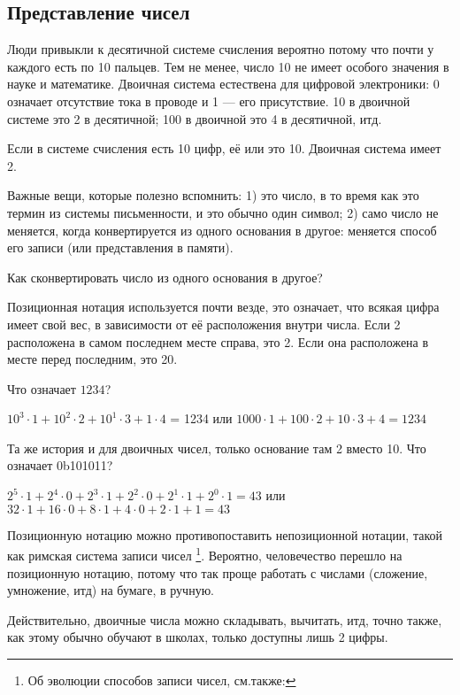 \subsection{Представление чисел}

Люди привыкли к десятичной системе счисления вероятно потому что почти у каждого есть по 10 пальцев.
Тем не менее, число 10 не имеет особого значения в науке и математике.
Двоичная система естествена для цифровой электроники: 0 означает отсутствие тока в проводе и 1 --- его присутствие.
10 в двоичной системе это 2 в десятичной; 100 в двоичной это 4 в десятичной, итд.

Если в системе счисления есть 10 цифр, её  или  это 10.
Двоичная система имеет  2.

Важные вещи, которые полезно вспомнить:
1)  это число, в то время как  это термин из системы письменности, и это обычно один символ;
2) само число не меняется, когда конвертируется из одного основания в другое: меняется способ его записи (или представления
в памяти).

Как сконвертировать число из одного основания в другое?

Позиционная нотация используется почти везде, это означает, что всякая цифра имеет свой вес, в зависимости от её расположения
внутри числа.
Если 2 расположена в самом последнем месте справа, это 2.
Если она расположена в месте перед последним, это 20.

Что означает $1234$?

$10^3 \cdot 1 + 10^2 \cdot 2 + 10^1 \cdot 3 + 1 \cdot 4$ = 1234 или
$1000 \cdot 1 + 100 \cdot 2 + 10 \cdot 3 + 4 = 1234$

Та же история и для двоичных чисел, только основание там 2 вместо 10.
Что означает 0b101011?

$2^5 \cdot 1 + 2^4 \cdot 0 + 2^3 \cdot 1 + 2^2 \cdot 0 + 2^1 \cdot 1 + 2^0 \cdot 1 = 43$ или
$32 \cdot 1 + 16 \cdot 0 + 8 \cdot 1 + 4 \cdot 0 + 2 \cdot 1 + 1 = 43$

Позиционную нотацию можно противопоставить непозиционной нотации, такой как римская система записи чисел
\footnote{Об эволюции способов записи чисел, см.также: }.
Вероятно, человечество перешло на позиционную нотацию, потому что так проще работать с числами (сложение, умножение, итд)
на бумаге, в ручную.

Действительно, двоичные числа можно складывать, вычитать, итд, точно также, как этому обычно обучают в школах,
только доступны лишь 2 цифры.

